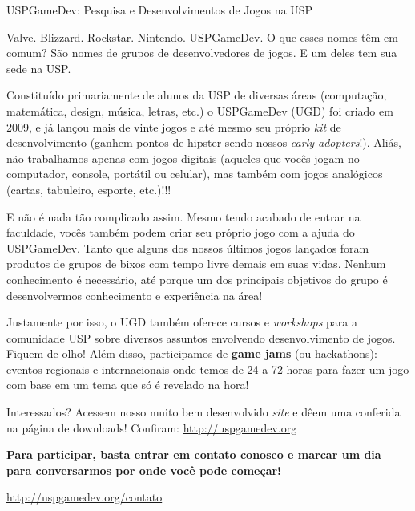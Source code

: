 \begin{subsecao}{USPGameDev: Pesquisa e Desenvolvimentos de Jogos na USP}


Valve. Blizzard. Rockstar. Nintendo. USPGameDev. O que esses nomes têm em comum?
São nomes de grupos de desenvolvedores de jogos. E um deles tem sua sede na USP.

Constituído primariamente de alunos da USP de diversas áreas (computação,
matemática, design, música, letras, etc.) o USPGameDev (UGD) foi criado em 2009,
e já lançou mais de vinte jogos e até mesmo seu próprio \textit{kit} de
desenvolvimento (ganhem pontos de hipster sendo nossos
\textit{early adopters}!). Aliás, não trabalhamos apenas com jogos digitais
(aqueles que vocês jogam no computador, console, portátil ou celular), mas
também com jogos analógicos (cartas, tabuleiro, esporte, etc.)!!!

E não é nada tão complicado assim. Mesmo tendo acabado de entrar na faculdade,
vocês também podem criar seu próprio jogo com a ajuda do USPGameDev. Tanto que
alguns dos nossos últimos jogos lançados foram produtos de grupos de bixos com
tempo livre demais em suas vidas. Nenhum conhecimento é necessário, até porque
um dos principais objetivos do grupo é desenvolvermos conhecimento e experiência
na área!

Justamente por isso, o UGD também oferece cursos e \textit{workshops} para a
comunidade USP sobre diversos assuntos envolvendo desenvolvimento de jogos.
Fiquem de olho! Além disso, participamos de \textbf{game jams} (ou hackathons):
eventos regionais e internacionais onde temos de 24 a 72 horas para fazer um
jogo com base em um tema que só é revelado na hora!

Interessados? Acessem nosso muito bem desenvolvido \textit{site} e dêem uma
conferida na página de downloads! Confiram: \url{http://uspgamedev.org}

\textbf{Para participar, basta entrar em contato conosco e marcar um dia para
conversarmos por onde você pode começar!}

\begin{center}
  \Large
  \url{http://uspgamedev.org/contato}
\end{center}

\end{subsecao}
